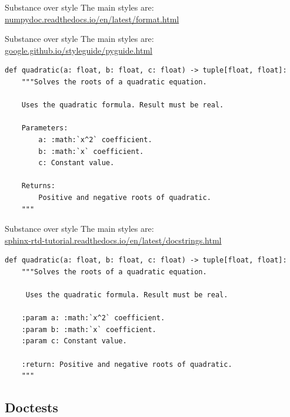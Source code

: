 \documentclass[usenames,dvipsnames]{beamer}
\newcommand{\kw}[1]{\textcolor{red}{\texttt{\detokenize{#1}}}}
\begin{document}
\begin{frame}[fragile]{Substance over style}
    The main styles are: 
    \kw{numpydoc} \\
    {\footnotesize \url{numpydoc.readthedocs.io/en/latest/format.html}}

    

\end{frame}
    
\begin{frame}[fragile]{Substance over style}
    The main styles are: 
    \kw{google} \\ 
    {\footnotesize \url{google.github.io/styleguide/pyguide.html}}

    \begin{lstlisting}[basicstyle=\scriptsize]
def quadratic(a: float, b: float, c: float) -> tuple[float, float]:
    """Solves the roots of a quadratic equation.

    Uses the quadratic formula. Result must be real.

    Parameters:
        a: :math:`x^2` coefficient.
        b: :math:`x` coefficient.
        c: Constant value.
    
    Returns:
        Positive and negative roots of quadratic.
    """
    \end{lstlisting}

\end{frame}

\begin{frame}[fragile]{Substance over style}
    The main styles are: 
    \kw{sphinx} \\ 
    {\footnotesize \url{sphinx-rtd-tutorial.readthedocs.io/en/latest/docstrings.html}}

    \begin{lstlisting}[basicstyle=\scriptsize]
def quadratic(a: float, b: float, c: float) -> tuple[float, float]:
    """Solves the roots of a quadratic equation.

     Uses the quadratic formula. Result must be real.
     
    :param a: :math:`x^2` coefficient.
    :param b: :math:`x` coefficient.
    :param c: Constant value.
    
    :return: Positive and negative roots of quadratic.
    """
    \end{lstlisting}

\end{frame}

\subsection{Doctests}
\end{document}
